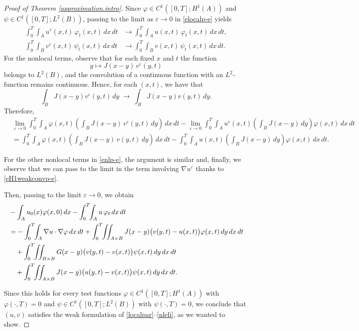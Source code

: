 \documentclass[reqno]{amsart}
\numberwithin{equation}{section}
\begin{document}
\begin{proof}[Proof of Theorem \ref{approximation.intro}]
Since $\varphi\in C^1([0,T];H^1(A))$ and $\psi\in C^1([0,T];L^2(B))$, 
passing to the limit as $\varepsilon\to0$ in \eqref{elocalp-e} yields
\begin{align*}
\int_0^T\!\!\int_A u^\varepsilon(x,t)\,\varphi_t(x,t)\,dx\,dt
&\longrightarrow
\int_0^T\!\!\int_A u(x,t)\,\varphi_t(x,t)\,dx\,dt,\\[0.2em]
\int_0^T\!\!\int_B v^\varepsilon(x,t)\,\psi_t(x,t)\,dx\,dt
&\longrightarrow
\int_0^T\!\!\int_B v(x,t)\,\psi_t(x,t)\,dx\,dt.
\end{align*}
For the nonlocal terms, observe that for each fixed $x$ and $t$ the function
\[
y\mapsto J(x-y)\,v^\varepsilon(y,t)
\]
belongs to $L^2(B)$, and the convolution of a continuous function with an $L^2$-function 
remains continuous. Hence, for each $(x,t)$, we have that
\[
\int_B J(x-y)v^\varepsilon(y,t)\,dy \;\longrightarrow\;
\int_B J(x-y)v(y,t)\,dy.
\]
Therefore,
\begin{align*}
&\lim_{\varepsilon\to0}
\int_0^T\!\!\int_A 
\varphi(x,t)\left(\int_B J(x-y)\,v^\varepsilon(y,t)\,dy\right)\,dx\,dt
-
\lim_{\varepsilon\to0}
\int_0^T\!\!\int_A 
u^\varepsilon(x,t)\left(\int_B J(x-y)\,dy\right)\varphi(x,t)\,dx\,dt\\[0.4em]
&=
\int_0^T\!\!\int_A 
\varphi(x,t)\left(\int_B J(x-y)\,v(y,t)\,dy\right)\,dx\,dt
-
\int_0^T\!\!\int_A 
u(x,t)\left(\int_B J(x-y)\,dy\right)\varphi(x,t)\,dx\,dt.
\end{align*}


For the other nonlocal terms in \eqref{enlp-e}, the argument is similar and, finally, we observe that we can pass to the limit
in the term involving $\nabla u^\varepsilon$ thanks to \eqref{eH1weakconvp-e}. 

Then, passing to
the limit $\varepsilon\to 0$, we obtain
\begin{align}
&-\int_A u_0(x)\varphi(x,0)\,dx
-\int_0^T\!\!\int_A u\,\varphi_t\,dx\,dt
\notag\\
&=
-\int_0^T\!\!\int_A \nabla u\cdot\nabla\varphi\,dx\,dt
+\int_0^T\!\!\iint_{A\times B}
   J(x-y)\big( v(y,t)-u(x,t) \big)\varphi(x,t)\,dy\,dx\,dt
\notag\\
&\quad
+\int_0^T\!\!\iint_{B\times B}
   G(x-y)\big( v(y,t)-v(x,t) \big)\psi(x,t)\,dy\,dx\,dt
\notag\\
&\quad
+\int_0^T\!\!\iint_{A\times B}
   J(x-y)\big( u(y,t)-v(x,t) \big)\psi(x,t)\,dy\,dx\,dt.
\end{align}

Since this holds for every test functions
$\varphi\in C^1([0,T];H^1(A))$ with $\varphi(\cdot,T)=0$ and
$\psi\in C^1([0,T];L^2(B))$ with $\psi(\cdot,T)=0$, we conclude that
$(u,v)$ satisfies the weak formulation of \eqref{localpar}--\eqref{nleli},
as we wanted to show.
\end{proof}
\end{document}
